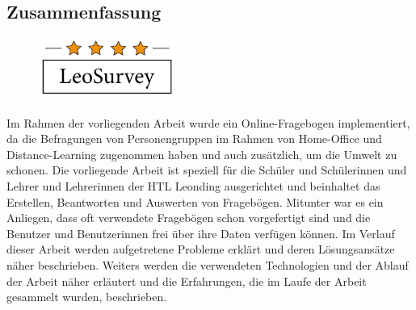 \begin{spacing}{1}
    \chapter*{Zusammenfassung}
\end{spacing}
\begin{figure}
    \begin{center}
      \includegraphics[width=0.4\textwidth]{pics/Logo.jpeg}
    \end{center}
\end{figure}
Im Rahmen der vorliegenden Arbeit wurde ein Online-Fragebogen implementiert, da die Befragungen von Personengruppen 
im Rahmen von Home-Office und Distance-Learning zugenommen haben und auch zusätzlich, um die Umwelt zu schonen. 
\newline
Die vorliegende Arbeit ist speziell für die Schüler und Schülerinnen und Lehrer und Lehrerinnen der HTL Leonding ausgerichtet und beinhaltet 
das Erstellen, Beantworten und Auswerten von Fragebögen. Mitunter war es ein Anliegen, dass 
oft verwendete Fragebögen schon vorgefertigt sind und die Benutzer und Benutzerinnen frei über ihre Daten verfügen können.
\newline
\newline
Im Verlauf dieser Arbeit werden aufgetretene Probleme erklärt und deren Lösungsansätze näher beschrieben. 
Weiters werden die verwendeten Technologien und der Ablauf der Arbeit näher erläutert und die Erfahrungen, die im Laufe der 
Arbeit gesammelt wurden, beschrieben.